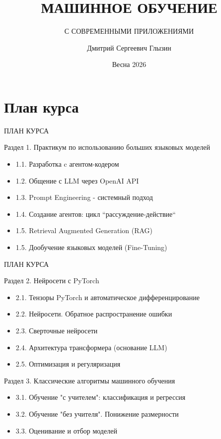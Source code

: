 \documentclass[aspectratio=169]{beamer}
\title{МАШИННОЕ ОБУЧЕНИЕ}
\subtitle{С СОВРЕМЕННЫМИ ПРИЛОЖЕНИЯМИ}
\author{Дмитрий Сергеевич Глызин}
\institute{Акселкомп / ЯрГУ}
\date{Весна 2026}
\newcommand{\backgroundimages}[4]{%
	\begin{tikzpicture}[remember picture, overlay]
		\node[anchor=south west, inner sep=0] at ([xshift=#1-0.3cm]current page.south west) 
		{};
		
		\node[anchor=north east, inner sep=0] at ([xshift=#1+0.3cm]current page.north east) 
		{};
		
		\node[anchor=south, inner sep=0] at ([xshift=#1-4cm]current page.south) 
		{};
	\end{tikzpicture}%
}
\begin{document}
	
	{
		\begin{frame}
			\titlepage
		\end{frame}
	}
	
	\section{План курса}
	{
	
		\begin{frame}{ПЛАН КУРСА}
			
			
			Раздел 1. Практикум по использованию больших языковых моделей
			\begin{itemize}
				\item [-] 1.1. Разработка c агентом-кодером
				\item [-] 1.2. Общение с LLM через OpenAI API
				\item [-] 1.3. Prompt Engineering - системный подход
				\item [-] 1.4. Создание агентов: цикл ``рассуждение-действие``
				\item [-] 1.5. Retrieval Augmented Generation (RAG)
				\item [-] 1.5. Дообучение языковых моделей (Fine-Tuning)
			\end{itemize}
			
			
		\end{frame}
		
		\begin{frame}{ПЛАН КУРСА}
			
						
			Раздел 2. Нейросети с PyTorch
			\begin{itemize}
				\item [-] 2.1. Тензоры PyTorch и автоматическое дифференцирование
				\item [-] 2.2. Нейросети. Обратное распространение ошибки
				\item [-] 2.3. Сверточные нейросети
				\item [-] 2.4. Архитектура трансформера (основание LLM)
				\item [-] 2.5. Оптимизация и регуляризация
			\end{itemize}
			
			Раздел 3. Классические алгоритмы машинного обучения
			\begin{itemize}
				\item [-] 3.1. Обучение "с учителем": классификация и регрессия
				\item [-] 3.2. Обучение "без учителя". Понижение размерности
				\item [-] 3.3. Оценивание и отбор моделей 
			\end{itemize}
			
		\end{frame}
    }	
\end{document}
